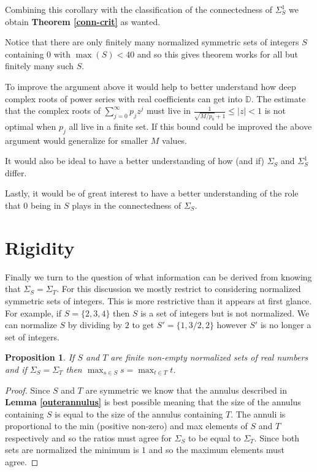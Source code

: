 \documentclass[11pt]{amsart}
\newtheorem{proposition}[theorem]{Proposition}
\numberwithin{theorem}{section} %
\numberwithin{corollary}{section}
\numberwithin{lemma}{section}
\numberwithin{proposition}{section}
\numberwithin{definition}{section}
\begin{document}
Combining this corollary with the classification of the connectedness of $\Sigma_S^1$ we obtain \textbf{Theorem \ref{conn-crit}} as wanted.

Notice that there are only finitely many normalized symmetric sets of integers $S$ containing $0$ with $\max(S) < 40$ and so this gives theorem works for all but finitely many such $S$.

To improve the argument above it would help to better understand how deep complex roots of power series with real coefficients can get into $\mathbb{D}$. The estimate that the complex roots of $\sum_{j=0}^\infty p_jz^j$ must live in $\frac{1}{\sqrt{M/p_0} + 1} \leqslant |z| < 1$ is not optimal when $p_j$ all live in a finite set. If this bound could be improved the above argument would generalize for smaller $M$ values.

It would also be ideal to have a better understanding of how (and if) $\Sigma_S$ and $\Sigma_S^1$ differ.

Lastly, it would be of great interest to have a better understanding of the role that $0$ being in $S$ plays in the connectedness of $\Sigma_S$.




\section{Rigidity}


Finally we turn to the question of what information can be derived from knowing that $\Sigma_S = \Sigma_T$. For this discussion we mostly restrict to considering normalized symmetric sets of integers. This is more restrictive than it appears at first glance. For example, if $S = \{ 2, 3, 4\}$ then $S$ is a set of integers but is not normalized. We can normalize $S$ by dividing by $2$ to get $S' = \{ 1, 3/2, 2 \}$ however $S'$ is no longer a set of integers. 

\begin{proposition}
If $S$ and $T$ are finite non-empty normalized sets of real numbers and if $\Sigma_S = \Sigma_T$ then $\max_{s \in S} s = \max_{t \in T} t$.
\end{proposition}

\begin{proof}
Since $S$ and $T$ are symmetric we know that the annulus described in \textbf{Lemma \ref{outerannulus}} is best possible meaning that the size of the annulus containing $S$ is equal to the size of the annulus containing $T$. The annuli is proportional to the min (positive non-zero) and max elements of $S$ and $T$ respectively and so the ratios must agree for $\Sigma_S$ to be equal to $\Sigma_T$. Since both sets are normalized the minimum is $1$ and so the maximum elements must agree.
\end{proof}
\end{document}
